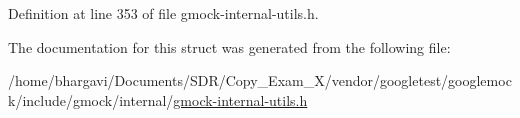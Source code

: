 Definition at line 353 of file gmock-\/internal-\/utils.\+h.



The documentation for this struct was generated from the following file\+:\begin{DoxyCompactItemize}
\item 
/home/bhargavi/\+Documents/\+S\+D\+R/\+Copy\+\_\+\+Exam\+\_\+X/vendor/googletest/googlemock/include/gmock/internal/\hyperlink{gmock-internal-utils_8h}{gmock-\/internal-\/utils.\+h}\end{DoxyCompactItemize}
